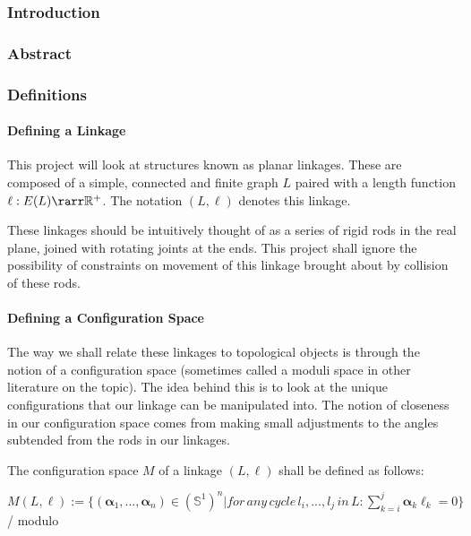 \documentclass[
]{article}
\author{}
\date{}
\begin{document}
\hypertarget{header-n7}{%
\subsubsection{Introduction}\label{header-n7}}

\hypertarget{header-n43}{%
\subsubsection{Abstract}\label{header-n43}}

\hypertarget{header-n44}{%
\subsubsection{Definitions}\label{header-n44}}

\hypertarget{header-n46}{%
\paragraph{Defining a Linkage}\label{header-n46}}

This project will look at structures known as planar linkages. These are
composed of a simple, connected and finite graph \(L\) paired with a
length function \(\ell: E(L) \rarr \mathbb R^+\). The notation
\((L,\ell)\) denotes this linkage.

These linkages should be intuitively thought of as a series of rigid
rods in the real plane, joined with rotating joints at the ends. This
project shall ignore the possibility of constraints on movement of this
linkage brought about by collision of these rods.

\hypertarget{header-n12}{%
\paragraph{Defining a Configuration Space}\label{header-n12}}

The way we shall relate these linkages to topological objects is through
the notion of a configuration space (sometimes called a moduli space in
other literature on the topic). The idea behind this is to look at the
unique configurations that our linkage can be manipulated into. The
notion of closeness in our configuration space comes from making small
adjustments to the angles subtended from the rods in our linkages.

The configuration space \(M\) of a linkage \((L,\ell )\) shall be
defined as follows:

\( M(L,\ell) := \{(\boldsymbol\alpha_1,..., \boldsymbol\alpha_n) \in (\mathbb S^1)^n | for \, any \, cycle \, l_i, ..., l_j\, in \, L: \sum_{k=i}^j \boldsymbol\alpha_k \ell_k = 0 \}\)
/ modulo
\end{document}
